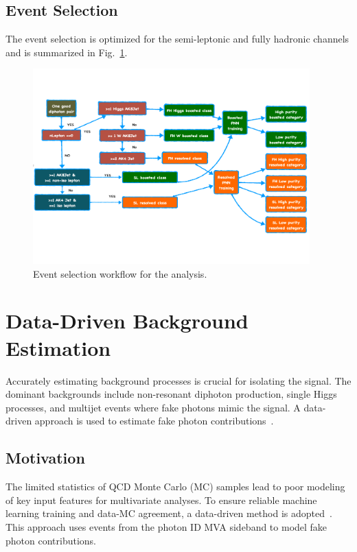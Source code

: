 \subsection*{Event Selection}
The event selection is optimized for the semi-leptonic and fully hadronic channels and is summarized in Fig.~\ref{fig:event_selection_workflow}.
\begin{figure}[!htbp]
    \centering
    \includegraphics[width=0.95\textwidth]{figures/diHiggsSearches/EventSelectionWorkflow.pdf}
    \caption{Event selection workflow for the \HHWW analysis.}
    \label{fig:event_selection_workflow}
\end{figure}


\section{Data-Driven Background Estimation}
Accurately estimating background processes is crucial for isolating the \HHWW signal.
The dominant backgrounds include non-resonant diphoton production, single Higgs processes, and multijet events
where fake photons mimic the signal.
A data-driven approach is used to estimate fake photon contributions~\cite{CMS:2020cga}.

\subsection{Motivation}
The limited statistics of QCD Monte Carlo (MC) samples lead to poor modeling of key input features for multivariate analyses.
To ensure reliable machine learning training and data-MC agreement, a data-driven method is adopted~\cite{CMS:2020cga}.
This approach uses events from the photon ID MVA sideband to model fake photon contributions.

